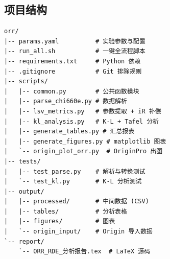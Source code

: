 \documentclass[12pt,a4paper]{ctexart}
\begin{document}
\subsection{项目结构}

\begin{verbatim}
orr/
|-- params.yaml          # 实验参数与配置
|-- run_all.sh           # 一键全流程脚本
|-- requirements.txt     # Python 依赖
|-- .gitignore           # Git 排除规则
|-- scripts/
|   |-- common.py        # 公共函数模块
|   |-- parse_chi660e.py # 数据解析
|   |-- lsv_metrics.py   # 参数提取 + iR 补偿
|   |-- kl_analysis.py   # K-L + Tafel 分析
|   |-- generate_tables.py # 汇总报表
|   |-- generate_figures.py # matplotlib 图表
|   `-- origin_plot_orr.py  # OriginPro 出图
|-- tests/
|   |-- test_parse.py    # 解析与转换测试
|   `-- test_kl.py       # K-L 分析测试
|-- output/
|   |-- processed/       # 中间数据 (CSV)
|   |-- tables/          # 分析表格
|   |-- figures/         # 图表
|   `-- origin_input/    # Origin 导入数据
`-- report/
    `-- ORR_RDE_分析报告.tex  # LaTeX 源码
\end{verbatim}
\end{document}
